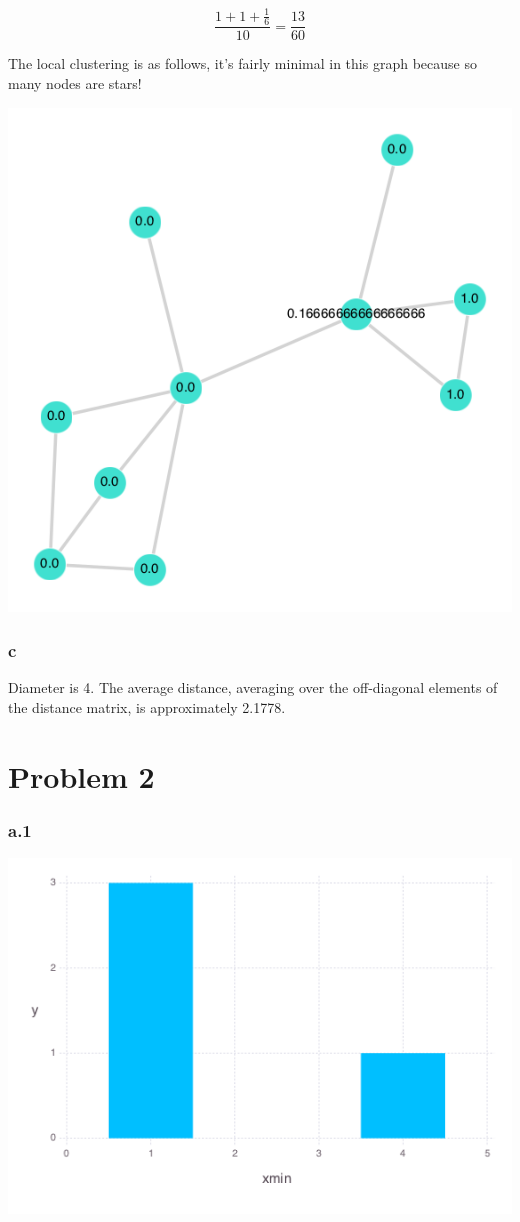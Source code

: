 \documentclass[a4paper,12pt]{article}
\begin{document}
$$
\frac{1 + 1 + \frac{1}{6}}{10} = \frac{13}{60}
$$

The local clustering is as follows, it's fairly minimal in this graph because so many nodes are stars!

\includegraphics[width=\linewidth]{figures/clustering.png}

\subsubsection*{c}

Diameter is 4. The average distance, averaging over the off-diagonal elements of the distance matrix, is approximately 2.1778.


\section*{Problem 2}

\subsubsection*{a.1}
\includegraphics[width=\linewidth]{figures/ps1_4_1.png}
\end{document}
